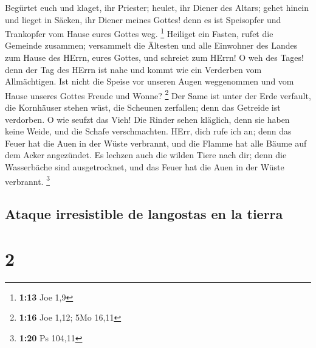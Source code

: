  Begürtet euch und klaget, ihr Priester; heulet, ihr
Diener des Altars; gehet hinein und lieget in Säcken, ihr Diener meines
Gottes! denn es ist Speisopfer und Trankopfer vom Hause eures Gottes
weg. \footnote{\textbf{1:13} Joe 1,9}  Heiliget ein
Fasten, rufet die Gemeinde zusammen; versammelt die Ältesten und alle
Einwohner des Landes zum Hause des HErrn, eures Gottes, und schreiet zum
HErrn!  O weh des Tages! denn der Tag des HErrn ist nahe
und kommt wie ein Verderben vom Allmächtigen.  Ist nicht
die Speise vor unseren Augen weggenommen und vom Hause unseres Gottes
Freude und Wonne? \footnote{\textbf{1:16} Joe 1,12; 5Mo 16,11}
 Der Same ist unter der Erde verfault, die Kornhäuser
stehen wüst, die Scheunen zerfallen; denn das Getreide ist verdorben.
 O wie seufzt das Vieh! Die Rinder sehen kläglich, denn
sie haben keine Weide, und die Schafe verschmachten. 
HErr, dich rufe ich an; denn das Feuer hat die Auen in der Wüste
verbrannt, und die Flamme hat alle Bäume auf dem Acker angezündet.
 Es lechzen auch die wilden Tiere nach dir; denn die
Wasserbäche sind ausgetrocknet, und das Feuer hat die Auen in der Wüste
verbrannt. \footnote{\textbf{1:20} Ps 104,11}

\hypertarget{ataque-irresistible-de-langostas-en-la-tierra}{%
\subsection{Ataque irresistible de langostas en la
tierra}\label{ataque-irresistible-de-langostas-en-la-tierra}}

\hypertarget{section-1}{%
\section{2}\label{section-1}}

